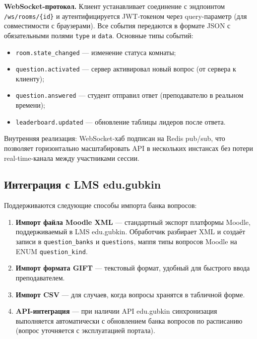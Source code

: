\textbf{WebSocket-протокол.} Клиент устанавливает соединение
с эндпоинтом \texttt{/ws/rooms/\{id\}} и аутентифицируется
JWT-токеном через query-параметр (для совместимости с браузерами).
Все события передаются в формате JSON с обязательными полями
\texttt{type} и \texttt{data}. Основные типы событий:
\begin{itemize}[noitemsep]
    \item \texttt{room.state\_changed} --- изменение статуса комнаты;
    \item \texttt{question.activated} --- сервер активировал новый
          вопрос (от сервера к клиенту);
    \item \texttt{question.answered} --- студент отправил ответ
          (преподавателю в реальном времени);
    \item \texttt{leaderboard.updated} --- обновление таблицы
          лидеров после ответа.
\end{itemize}

Внутренняя реализация: WebSocket-хаб подписан на Redis pub/sub,
что позволяет горизонтально масштабировать API в нескольких
инстансах без потери real-time-канала между участниками сессии.

\subsection{Интеграция с LMS edu.gubkin}


Поддерживаются следующие способы импорта банка вопросов:
\begin{enumerate}[label=\arabic*., noitemsep]
    \item \textbf{Импорт файла Moodle XML} --- стандартный экспорт
          платформы Moodle, поддерживаемый в LMS edu.gubkin.
          Обработчик разбирает XML и создаёт записи
          в \texttt{question\_banks} и \texttt{questions}, маппя
          типы вопросов Moodle на ENUM \texttt{question\_kind}.
    \item \textbf{Импорт формата GIFT} --- текстовый формат,
          удобный для быстрого ввода преподавателем.
    \item \textbf{Импорт CSV} --- для случаев, когда вопросы
          хранятся в табличной форме.
    \item \textbf{API-интеграция} --- при наличии API
          edu.gubkin синхронизация выполняется автоматически
          с обновлением банка вопросов по расписанию (вопрос
          уточняется с эксплуатацией портала).
\end{enumerate}

